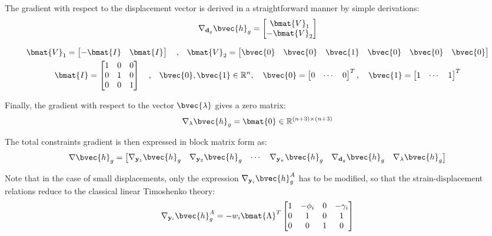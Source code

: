 \begin{appendices}
\noindent The gradient with respect to the displacement vector is derived in a
straightforward manner by simple derivations:
\begin{gather}
	\nabla_{\mathbf{d}_g}\bvec{h}_g = \begin{bmatrix}
		\bmat{V}_1 \\ -\bmat{V}_2
	\end{bmatrix}
	\label{eq:congradisp}
\end{gather}

\begin{gather}
	\bmat{V}_1 = \begin{bmatrix}
		-\bmat{I} & \bmat{I}
	\end{bmatrix}\quad\text{,}\quad
	\bmat{V}_2 = \begin{bmatrix}
		\bvec{0} & \bvec{0} & \bvec{1} & \bvec{0} & \bvec{0} & \bvec{0}
	\end{bmatrix}\nonumber\\
	\bmat{I} = \begin{bmatrix}
		1 & 0 & 0\\
		0 & 1 & 0\\
		0 & 0 & 1
	\end{bmatrix}\quad\text{,}\quad \bvec{0},\bvec{1}\in\mathbb{R}^n,\quad 
	\bvec{0}=\begin{bmatrix}
		0 & \cdots & 0
	\end{bmatrix}^T,\quad \bvec{1}=\begin{bmatrix}
		1 & \cdots & 1
	\end{bmatrix}^T\nonumber
\end{gather}

\noindent Finally, the gradient with respect to the vector $\bvec{\lambda}$
gives a zero matrix:
\begin{gather}
	\nabla_{\mathbf{\lambda}}\bvec{h}_g = 
	\bmat{0}\in\mathbb{R}^{(n+3)\times(n+3)}
\end{gather}

\noindent The total constraints gradient is then expressed in block matrix
form as:
\begin{gather}
	\nabla\bvec{h}_g = \begin{bmatrix}
		\nabla_{\mathbf{y}_1}\bvec{h}_g & \nabla_{\mathbf{y}_2}\bvec{h}_g &
		\cdots & \nabla_{\mathbf{y}_n}\bvec{h}_g & 
		\nabla_{\mathbf{d}_g}\bvec{h}_g &
		\nabla_{\mathbf{\lambda}}\bvec{h}_g
	\end{bmatrix}\nonumber
\end{gather}

\noindent Note that in the case of small displacements, only the
expression $\nabla_{\mathbf{y}_i}\bvec{h}_g^A$ has to be modified, so that
the strain-displacement relations reduce to the classical linear Timoshenko
theory:
\begin{gather}
	\nabla_{\mathbf{y}_i}\bvec{h}_g^A =-w_i\bmat{\Lambda}^T\begin{bmatrix}
		1 & -\phi_i & 0 & -\gamma_i\\
		0 & 1 & 0 & 1\\
		0 & 0 & 1 & 0
	\end{bmatrix}\nonumber
\end{gather}


\end{appendices}

